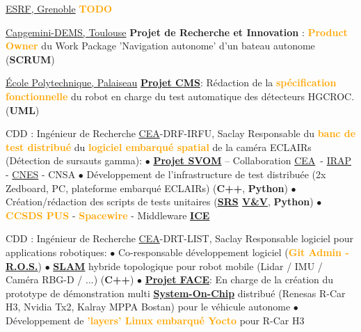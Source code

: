 \documentclass[
	a4paper,
	subsectioncolor=cvblue!70,
]{fortysecondscv}
\newcommand{\cea}{\href{http://www.cea.fr/}{CEA}}
\newcommand{\ros}{\href{http://www.ros.org/}{R.O.S.}}
\newcommand{\hl}[1]{\textbf{\textcolor{orange}{#1}}}
\begin{document}
\begin{cvtable}[2]
  {\href{https://www.esrf.fr/}{ESRF, Grenoble}}
  {
    \hl{TODO}
  }

  {\href{https://www.capgemini.com/service/digital-services/digital-engineering-and-manufacturing-services/}{Capgemini-DEMS, Toulouse}}
  {
    \textbf{Projet de Recherche et Innovation} : \hl{Product Owner} du Work Package
    'Navigation autonome' d'un bateau autonome (\textbf{SCRUM})
  }

  {\href{https://www.polytechnique.edu/fr/le-laboratoire-leprince-ringuet-llr}{École Polytechnique, Palaiseau}}
  {
    \textbf{\href{http://polywww.in2p3.fr/-cms-45-?lang=fr}{Projet CMS}}:
    Rédaction de la \hl{spécification fonctionnelle} du robot en charge du test
    automatique des détecteurs HGCROC. (\textbf{UML})
  }

  {CDD : Ingénieur de Recherche}
  {\cea-DRF-IRFU, Saclay}
  {
    Responsable du \hl{banc de test distribué} du \hl{logiciel embarqué spatial} de la
    caméra ECLAIRs (Détection de sursauts gamma):\newline
    $\bullet$ \hl{\href{http://www.svom.fr/}{Projet SVOM}} -- Collaboration \cea\
    - \href{http://www.irap.omp.eu/}{IRAP} - \href{https://cnes.fr/fr}{CNES} - CNSA\newline
    $\bullet$ Développement de l'infrastructure de test distribuée (2x Zedboard, PC,
    plateforme embarqué ECLAIRs) (\textbf{C++}, \textbf{Python})\newline
    $\bullet$ Création/rédaction des scripts de tests unitaires
    (\hl{\href{https://en.wikipedia.org/wiki/Software_requirements_specification}{SRS} \href{https://en.wikipedia.org/wiki/Software_verification_and_validation}{V\&V}}, \textbf{Python})\newline
    $\bullet$ \hl{CCSDS PUS} - \hl{Spacewire} - Middleware
    \href{https://zeroc.com/products/ice}{\textbf{ICE}}
  }

  {CDD : Ingénieur de Recherche}
  {\cea-DRT-LIST, Saclay}
  {
    Responsable logiciel pour applications robotiques:\newline
    $\bullet$ Co-responsable développement logiciel (\hl{Git Admin - \ros})\newline
    $\bullet$ \hl{\href{https://en.wikipedia.org/wiki/Simultaneous_localization_and_mapping}{SLAM}} hybride topologique pour robot mobile (Lidar / IMU / Caméra RBG-D
    / ...) (\textbf{C++})\newline
    $\bullet$ \textbf{\href{https://www.designspot.fr/portfolio/face/}{Projet
        FACE}}: En charge de la création du prototype de démonstration multi
    \hl{\href{https://en.wikipedia.org/wiki/System_on_a_chip}{System-On-Chip}}
    distribué (Renesas R-Car H3, Nvidia Tx2, Kalray MPPA Bostan) pour le
    véhicule autonome\newline
    $\bullet$ Développement de \hl{'layers' Linux embarqué Yocto} pour R-Car H3
  }


\end{cvtable}
\end{document}
